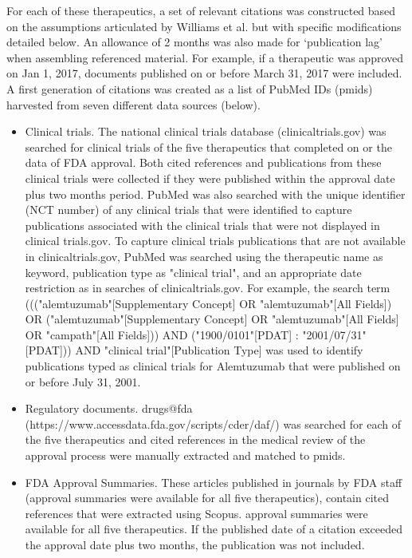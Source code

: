 \documentclass[10pt,letterpaper]{article}
\begin{document}
For each of these therapeutics, a set of relevant citations was constructed based on the assumptions articulated by Williams et al. but with specific modifications detailed below. An allowance of 2 months was also made for `publication lag' when assembling referenced material. For example, if a therapeutic was approved on Jan 1, 2017, documents published  on or before March 31, 2017 were included. A first generation of citations was created as a list of PubMed IDs (pmids) harvested from seven different data sources (below).  
\begin {itemize}
\item Clinical trials. The national clinical trials database (clinicaltrials.gov) was searched for clinical trials of the five therapeutics that completed on or the data of FDA approval. Both cited references and publications from these clinical trials were collected if they were published within the approval date plus two months period. PubMed was also searched with the unique identifier (NCT number) of any clinical trials that were identified to capture publications associated with the clinical trials that were not displayed in clinical trials.gov. To capture clinical trials publications that are not available in clinicaltrials.gov, PubMed was searched using the therapeutic name as keyword, publication type as "clinical trial", and an appropriate date restriction as in searches of clinicaltrials.gov. For example, the search term ((("alemtuzumab"[Supplementary Concept] OR "alemtuzumab"[All Fields]) OR ("alemtuzumab"[Supplementary Concept] OR "alemtuzumab"[All Fields] OR "campath"[All Fields])) AND ("1900/0101"[PDAT] : "2001/07/31"[PDAT])) AND "clinical trial"[Publication Type] was used to identify publications typed as clinical trials for Alemtuzumab that were published on or before July 31, 2001.

\item Regulatory documents. drugs@fda (https://www.accessdata.fda.gov/scripts/cder/daf/) was searched for each of the five therapeutics and cited references in the medical review of the approval process were manually extracted and matched to pmids.

\item FDA Approval Summaries. These articles published in journals by FDA staff (approval summaries were available for all five therapeutics), contain cited references that were extracted using Scopus. approval summaries were available for all five therapeutics. If the published date of a citation exceeded the approval date plus two months, the publication was not included.


\end{itemize}
\end{document}
